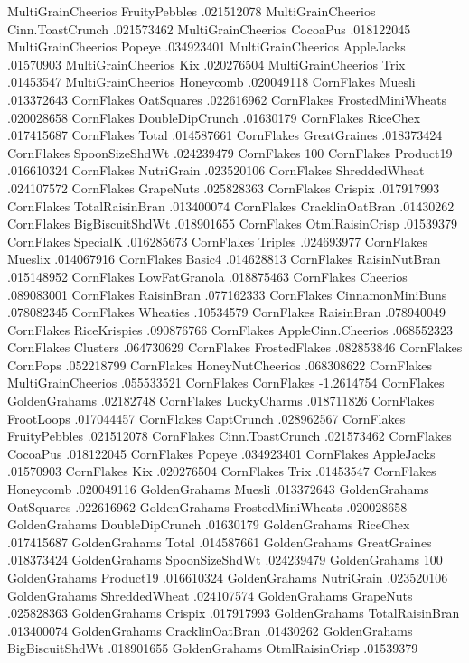 MultiGrainCheerios	FruityPebbles	.021512078
MultiGrainCheerios	Cinn.ToastCrunch	.021573462
MultiGrainCheerios	CocoaPus	.018122045
MultiGrainCheerios	Popeye	.034923401
MultiGrainCheerios	AppleJacks	.01570903
MultiGrainCheerios	Kix	.020276504
MultiGrainCheerios	Trix	.01453547
MultiGrainCheerios	Honeycomb	.020049118
CornFlakes	Muesli	.013372643
CornFlakes	OatSquares	.022616962
CornFlakes	FrostedMiniWheats	.020028658
CornFlakes	DoubleDipCrunch	.01630179
CornFlakes	RiceChex	.017415687
CornFlakes	Total	.014587661
CornFlakes	GreatGraines	.018373424
CornFlakes	SpoonSizeShdWt	.024239479
CornFlakes	100%
CornFlakes	Product19	.016610324
CornFlakes	NutriGrain	.023520106
CornFlakes	ShreddedWheat	.024107572
CornFlakes	GrapeNuts	.025828363
CornFlakes	Crispix	.017917993
CornFlakes	TotalRaisinBran	.013400074
CornFlakes	CracklinOatBran	.01430262
CornFlakes	BigBiscuitShdWt	.018901655
CornFlakes	OtmlRaisinCrisp	.01539379
CornFlakes	SpecialK	.016285673
CornFlakes	Triples	.024693977
CornFlakes	Mueslix	.014067916
CornFlakes	Basic4	.014628813
CornFlakes	RaisinNutBran	.015148952
CornFlakes	LowFatGranola	.018875463
CornFlakes	Cheerios	.089083001
CornFlakes	RaisinBran	.077162333
CornFlakes	CinnamonMiniBuns	.078082345
CornFlakes	Wheaties	.10534579
CornFlakes	RaisinBran	.078940049
CornFlakes	RiceKrispies	.090876766
CornFlakes	AppleCinn.Cheerios	.068552323
CornFlakes	Clusters	.064730629
CornFlakes	FrostedFlakes	.082853846
CornFlakes	CornPops	.052218799
CornFlakes	HoneyNutCheerios	.068308622
CornFlakes	MultiGrainCheerios	.055533521
CornFlakes	CornFlakes	-1.2614754
CornFlakes	GoldenGrahams	.02182748
CornFlakes	LuckyCharms	.018711826
CornFlakes	FrootLoops	.017044457
CornFlakes	CaptCrunch	.028962567
CornFlakes	FruityPebbles	.021512078
CornFlakes	Cinn.ToastCrunch	.021573462
CornFlakes	CocoaPus	.018122045
CornFlakes	Popeye	.034923401
CornFlakes	AppleJacks	.01570903
CornFlakes	Kix	.020276504
CornFlakes	Trix	.01453547
CornFlakes	Honeycomb	.020049116
GoldenGrahams	Muesli	.013372643
GoldenGrahams	OatSquares	.022616962
GoldenGrahams	FrostedMiniWheats	.020028658
GoldenGrahams	DoubleDipCrunch	.01630179
GoldenGrahams	RiceChex	.017415687
GoldenGrahams	Total	.014587661
GoldenGrahams	GreatGraines	.018373424
GoldenGrahams	SpoonSizeShdWt	.024239479
GoldenGrahams	100%
GoldenGrahams	Product19	.016610324
GoldenGrahams	NutriGrain	.023520106
GoldenGrahams	ShreddedWheat	.024107574
GoldenGrahams	GrapeNuts	.025828363
GoldenGrahams	Crispix	.017917993
GoldenGrahams	TotalRaisinBran	.013400074
GoldenGrahams	CracklinOatBran	.01430262
GoldenGrahams	BigBiscuitShdWt	.018901655
GoldenGrahams	OtmlRaisinCrisp	.01539379
